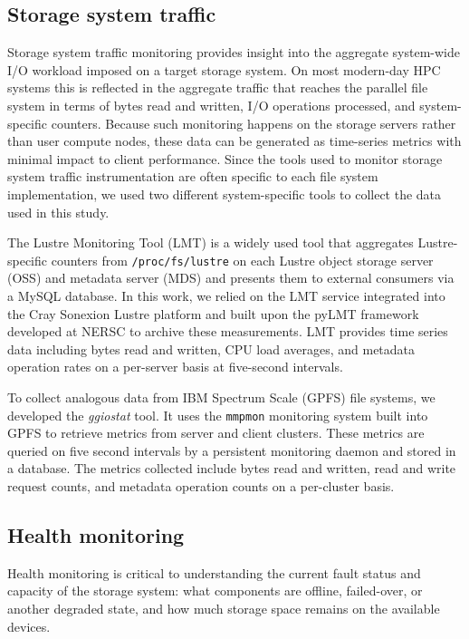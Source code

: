 \subsection{Storage system traffic} \label{sec:methods/storagesystraffic}

Storage system traffic monitoring provides insight into the aggregate system-wide I/O workload imposed on a target storage system.
On most modern-day HPC systems this is reflected in the aggregate traffic that reaches the parallel file system in terms of bytes read and written, I/O operations processed, and system-specific counters.
Because such monitoring happens on the storage servers rather than user compute nodes, these data can be generated as time-series metrics with minimal impact to client performance.
Since the tools used to monitor storage system traffic instrumentation are often specific to each file system implementation, we used two different system-specific tools to collect the data used in this study.

\label{sec:methods/lmt}
The Lustre Monitoring Tool (LMT) is a widely used tool that aggregates Lustre-specific counters from \texttt{/proc/fs/lustre} on each Lustre object storage server (OSS) and metadata server (MDS) and presents them to external consumers via a MySQL database.
In this work, we relied on the LMT service integrated into the Cray Sonexion Lustre platform \cite{Keopp2014} and built upon the pyLMT framework developed at NERSC \cite{Uselton2009} to archive these measurements.
LMT provides time series data including bytes read and written, CPU load averages, and metadata operation rates on a per-server basis at five-second intervals.

\label{sec:methods/ggiostat}
To collect analogous data from IBM Spectrum Scale (GPFS) file systems, we developed the \emph{ggiostat} tool.
It uses the \texttt{mmpmon} monitoring system built into GPFS to retrieve metrics from server and client clusters.
These metrics are queried on five second intervals by a persistent monitoring daemon and stored in a database.
The metrics collected include bytes read and written, read and write request counts, and metadata operation counts on a per-cluster basis.

\subsection{Health monitoring} \label{sec:methods/health}

Health monitoring is critical to understanding the current fault status and capacity of the
storage system: what components are offline, failed-over, or another degraded state, and how much storage space remains on the available devices.

